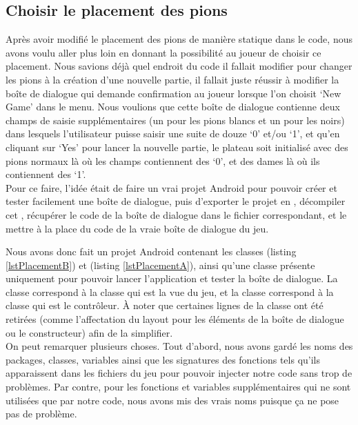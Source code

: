 
\subsection{Choisir le placement des pions}

Après avoir modifié le placement des pions de manière statique dans le code, nous avons voulu aller plus loin en donnant la possibilité au joueur de choisir ce placement. Nous savions déjà quel endroit du code il fallait modifier pour changer les pions à la création d'une nouvelle partie, il fallait juste réussir à modifier la boîte de dialogue qui demande confirmation au joueur lorsque l'on choisit `New Game' dans le menu. Nous voulions que cette boîte de dialogue contienne deux champs de saisie supplémentaires (un pour les pions blancs et un pour les noirs) dans lesquels l'utilisateur puisse saisir une suite de douze `0' et/ou `1', et qu'en cliquant sur `Yes' pour lancer la nouvelle partie, le plateau soit initialisé avec des pions normaux là où les champs contiennent des `0', et des dames là où ils contiennent des `1'.\\

Pour ce faire, l'idée était de faire un vrai projet Android pour pouvoir créer et tester facilement une boîte de dialogue, puis d'exporter le projet en , décompiler cet , récupérer le code de la boîte de dialogue dans le fichier  correspondant, et le mettre à la place du code de la vraie boîte de dialogue du jeu.

Nous avons donc fait un projet Android contenant les classes  (listing \ref{lstPlacementB}) et  (listing \ref{lstPlacementA}), ainsi qu'une classe  présente uniquement pour pouvoir lancer l'application et tester la boîte de dialogue. La classe  correspond à la classe  qui est la vue du jeu, et la classe  correspond à la classe  qui est le contrôleur. \`{A} noter que certaines lignes de la classe  ont été retirées (comme l'affectation du layout pour les éléments de la boîte de dialogue ou le constructeur) afin de la simplifier.\\

On peut remarquer plusieurs choses. Tout d'abord, nous avons gardé les noms des packages, classes, variables ainsi que les signatures des fonctions tels qu'ils apparaissent dans les fichiers  du jeu pour pouvoir injecter notre code sans trop de problèmes. Par contre, pour les fonctions et variables supplémentaires qui ne sont utilisées que par notre code, nous avons mis des vrais noms puisque ça ne pose pas de problème.

